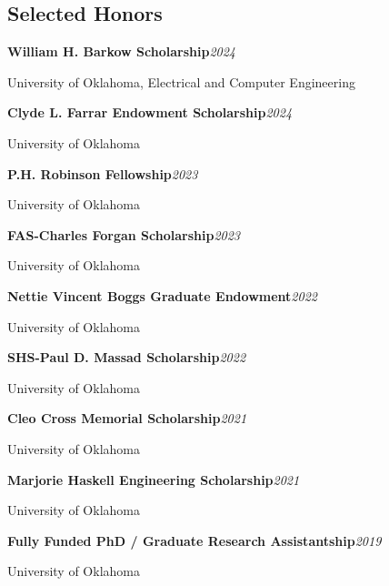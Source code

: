 \documentclass[8pt,letterpaper]{extarticle}
\newcommand{\entry}[2]{\Needspace{4\baselineskip}\textbf{#1}\hfill\textit{#2}\par}
\begin{document}
\subsection{Selected Honors}
\entry{William H. Barkow Scholarship}{2024}
{\small University of Oklahoma, Electrical and Computer Engineering\par}
\entry{Clyde L. Farrar Endowment Scholarship}{2024}
{\small University of Oklahoma\par}
\entry{P.H. Robinson Fellowship}{2023}
{\small University of Oklahoma\par}
\entry{FAS-Charles Forgan Scholarship}{2023}
{\small University of Oklahoma\par}
\entry{Nettie Vincent Boggs Graduate Endowment}{2022}
{\small University of Oklahoma\par}
\entry{SHS-Paul D. Massad Scholarship}{2022}
{\small University of Oklahoma\par}
\entry{Cleo Cross Memorial Scholarship}{2021}
{\small University of Oklahoma\par}
\entry{Marjorie Haskell Engineering Scholarship}{2021}
{\small University of Oklahoma\par}
\entry{Fully Funded PhD / Graduate Research Assistantship}{2019}
{\small University of Oklahoma\par}
\end{document}

